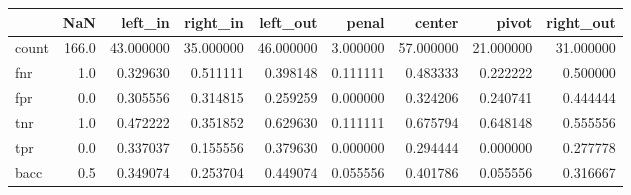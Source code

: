\begin{tabular}{lrrrrrrrr}
\toprule
{} &    NaN &    left\_in &   right\_in &   left\_out &     penal &     center &      pivot &  right\_out \\
\midrule
count &  166.0 &  43.000000 &  35.000000 &  46.000000 &  3.000000 &  57.000000 &  21.000000 &  31.000000 \\
fnr   &    1.0 &   0.329630 &   0.511111 &   0.398148 &  0.111111 &   0.483333 &   0.222222 &   0.500000 \\
fpr   &    0.0 &   0.305556 &   0.314815 &   0.259259 &  0.000000 &   0.324206 &   0.240741 &   0.444444 \\
tnr   &    1.0 &   0.472222 &   0.351852 &   0.629630 &  0.111111 &   0.675794 &   0.648148 &   0.555556 \\
tpr   &    0.0 &   0.337037 &   0.155556 &   0.379630 &  0.000000 &   0.294444 &   0.000000 &   0.277778 \\
bacc  &    0.5 &   0.349074 &   0.253704 &   0.449074 &  0.055556 &   0.401786 &   0.055556 &   0.316667 \\
\bottomrule
\end{tabular}
